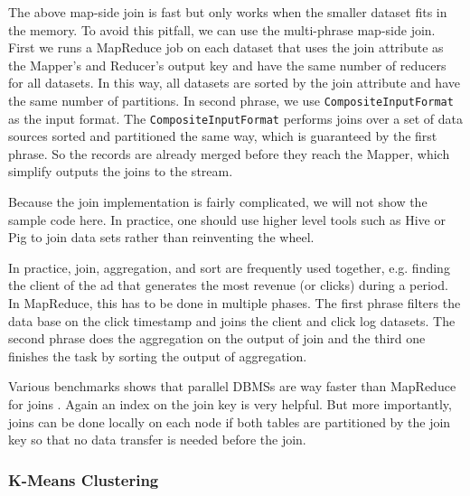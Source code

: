 \documentclass[11pt]{book}
\begin{document}
The above map-side join is fast but only works when the smaller dataset fits in the memory. To avoid this pitfall, we can use the multi-phrase map-side join. First we runs a MapReduce job on each dataset that uses the join attribute as the Mapper's and Reducer's output key and have the same number of reducers for all datasets. In this way, all datasets are sorted by the join attribute and have the same number of partitions. In second phrase, we use \texttt{CompositeInputFormat} as the input format. The \texttt{CompositeInputFormat} performs joins over a set of data sources sorted and partitioned the same way, which is guaranteed by the first phrase. So the records are already merged before they reach the Mapper, which simplify outputs the joins to the stream.

Because the join implementation is fairly complicated, we will not show the sample code here. In practice, one should use higher level tools such as Hive or Pig to join data sets rather than reinventing the wheel.

In practice, join, aggregation, and sort are frequently used together, e.g. finding the client of the ad that generates the most revenue (or clicks) during a period. In MapReduce, this has to be done in multiple phases. The first phrase filters the data base on the click timestamp and joins the client and click log datasets. The second phrase does the aggregation on the output of join and the third one finishes the task by sorting the output of aggregation. 

Various benchmarks shows that parallel DBMSs are way faster than MapReduce for joins \cite{Pavlo:2009:CAL}. Again an index on the join key is very helpful. But more importantly, joins can be done locally on each node if both tables are partitioned by the join key so that no data transfer is needed before the join.

\subsubsection{K-Means Clustering}
\end{document}
